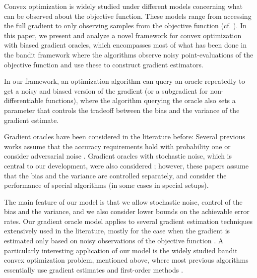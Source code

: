 Convex optimization is widely studied under different models concerning what can be observed about the objective function. 
These models range from accessing the full gradient to only observing samples from the objective function (cf. \citealp{nesterov2004introductory,DeGliNe14,HaLe14:SOC,PoTsy90,flaxman2005online,AbHaRa08,AgDeXi10,Ne11:TR,AgFoHsuKaRa13:SIAM,katkul,kushcla,spall1992multivariate,spall1997one,Dip03:AoS,bhatnagar-book,duchi2015optimal}). In this paper, we present and analyze a novel framework for convex optimization with biased gradient oracles, which encompasses most of what has been done in the bandit framework where the algorithms observe noisy point-evaluations of the objective function and use these to construct gradient estimators.

In our framework, an optimization algorithm can query an oracle repeatedly to get a noisy and biased version of the gradient (or a subgradient for non-differentiable functions), where the algorithm querying the oracle also sets a parameter that controls the tradeoff between the bias and the variance of the gradient estimate.

Gradient oracles have been considered in the literature before: Several previous works assume that the accuracy requirements hold with probability one \citep{dAsp08,Baes09,DeGliNe14} or consider adversarial noise \citep{SchRoBa11}. Gradient oracles with stochastic noise, which is central to our development, were also considered \citep{JN11a,Hon12,DvoGa15}; however, these papers assume that the bias and the variance are controlled separately, and consider the performance of special algorithms (in some cases in special setups).

The main feature of our model is that we allow stochastic noise, control of the bias and the variance, and we also consider lower bounds on the achievable error rates. Our gradient oracle model applies to several gradient estimation techniques extensively used in the literature, mostly for the case when the gradient is estimated only based on noisy observations of the objective function \citep{katkul,kushcla,spall1992multivariate,spall1997one,Dip03:AoS,bhatnagar-book,duchi2015optimal}. A particularly interesting application of our model is the widely studied bandit convex optimization problem,
mentioned above,
where most previous algorithms 
essentially use gradient estimates and first-order methods 
\citep{PoTsy90,flaxman2005online,AbHaRa08,AgDeXi10,Ne11:TR,AgFoHsuKaRa13:SIAM,HaLe14:SOC}.

